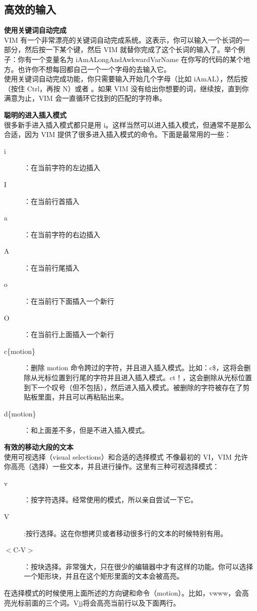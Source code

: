 \subsection{高效的输入}
\textbf{使用关键词自动完成}\\
VIM 有一个非常漂亮的关键词自动完成系统。这表示，你可以输入一个长词的一部分，然后按一下某个键，然后 VIM 就替你完成了这个长词的输入了。举个例子：你有一个变量名为 iAmALongAndAwkwardVarName 在你写的代码的某个地方。也许你不想每回都自己一个一个字母的去输入它。\\
使用关键词自动完成功能，你只需要输入开始几个字母（比如 iAmAL），然后按 （按住 Ctrl，再按 N）或者 。如果 VIM 没有给出你想要的词，继续按，直到你满意为止，VIM 会一直循环它找到的匹配的字符串。

\textbf{聪明的进入插入模式}\\
很多新手进入插入模式都只是用 i。这样当然可以进入插入模式，但通常不是那么合适，因为 VIM 提供了很多进入插入模式的命令。下面是最常用的一些：
\begin{description}
 	\item[i]：在当前字符的左边插入 
 	\item[I]：在当前行首插入
 	\item[a]：在当前字符的右边插入 
 	\item[A]：在当前行尾插入 
 	\item[o]：在当前行下面插入一个新行
 	\item[O]：在当前行上面插入一个新行
 	\item[c\{motion\}]：删除 motion 命令跨过的字符，并且进入插入模式。比如：c\$，这将会删除从光标位置到行尾的字符并且进入插入模式。ct！，这会删除从光标位置到下一个叹号（但不包括），然后进入插入模式。被删除的字符被存在了剪贴板里面，并且可以再粘贴出来。
 	\item[d\{motion\}]：和上面差不多，但是不进入插入模式。
\end{description}
 
\textbf{有效的移动大段的文本} \\
使用可视选择（visual selections）和合适的选择模式
不像最初的 VI，VIM 允许你高亮（选择）一些文本，并且进行操作。这里有三种可视选择模式：
\begin{description}
	\item[v]：按字符选择。经常使用的模式，所以亲自尝试一下它。
	\item[V]:按行选择。这在你想拷贝或者移动很多行的文本的时候特别有用。
	\item[$<$C-V$>$]：按块选择。非常强大，只在很少的编辑器中才有这样的功能。你可以选择一个矩形块，并且在这个矩形里面的文本会被高亮。
\end{description}
在选择模式的时候使用上面所述的方向键和命令（motion）。比如，vwww，会高亮光标前面的三个词。Vjj将会高亮当前行以及下面两行。

